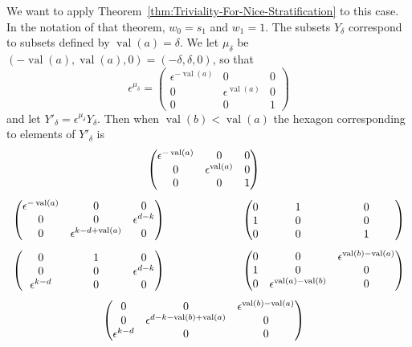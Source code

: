 \documentclass{amsart}
\theoremstyle{definition}
\def\e{\epsilon}
\def\val{\mathop{\mathrm{val}}}
\def\heximagessqueezed#1#2#3#4#5#6#7{
  \heximagessqueezedcarefully{#1}{2em}{#2}{#3}{#4}{#5}{#6}{#7}
}
\def\heximagessqueezedcarefully#1#2#3#4#5#6#7#8{
  \begin{array}{ccc}
    & #3 & \\[#2]
    #5 \hspace{-#1} & & \hspace{-#1} #4 \\[2em]
    #6 \hspace{-#1} & & \hspace{-#1} #7 \\[#2]
    & #8 &
  \end{array}
}
\begin{document}
  We want to apply Theorem~\ref{thm:Triviality-For-Nice-Stratification} to this
  case.  In the notation of that theorem, $w_0 = s_1$ and $w_1 = 1$.  The
  subsets $Y_\delta$ correspond to subsets defined by $\val(a) = \delta$.  We
  let $\mu_\delta$ be $(-\val(a), \val(a), 0) = (-\delta, \delta, 0)$, so that
  \begin{equation*}
    \e^{\mu_\delta} = \begin{pmatrix}
      \e^{-\val(a)} & 0 & 0 \\
      0 & \e^{\val(a)} & 0 \\
      0 & 0 & 1
    \end{pmatrix}
  \end{equation*}
  and let $Y'_\delta = \e^{\mu_\delta} Y_\delta$.  Then when $\val(b) <
  \val(a)$ the hexagon corresponding to elements of $Y'_\delta$ is
  \begin{equation*}
    \heximagessqueezed{6.5em}
        {
          \begin{pmatrix}
            \e^{-\val(a)} & 0 & 0 \\ 
            0 & \e^{\val(a)} & 0 \\
            0 & 0 & 1
          \end{pmatrix}
        }
        {
          \begin{pmatrix}
             & \hphantom{\e^{\val(a) - \val(b)}} &
	       \hphantom{\e^{\val(b)-\val(a)}} \\[-1em]
            0 & 1 & 0 \\
            1 & 0 & 0 \\
            0 & 0 & 1
          \end{pmatrix}
        }
        {
          \begin{pmatrix}
            \e^{-\val(a)} & 0 & 0 \\
            0 & 0 & \e^{d - k} \\
            0 & \e^{k - d + \val(a)}  & 0
          \end{pmatrix} 
        }
        {
          \begin{pmatrix}
            \hphantom{\e^{-\val(a)}} & \hphantom{\e^{k - d + \val(a)}} & \\[-1em]
            0 & 1 & 0 \\
            0 & 0 & \e^{d - k} \\
            \e^{k-d} & 0 & 0
           \end{pmatrix}
        }
        {
          \begin{pmatrix}
            0 & 0 & \e^{\val(b)-\val(a)} \\
            1 & 0 & 0 \\
            0 & \e^{\val(a) - \val(b)} & 0  
          \end{pmatrix}
        }
        {
          \begin{pmatrix}
            0 & 0 & \e^{\val(b) - \val(a)} \\
            0 & \e^{d-k-\val(b) + \val(a)} & 0 \\
            \e^{k-d} & 0 & 0
          \end{pmatrix}
        }
  \end{equation*}
\end{document}
